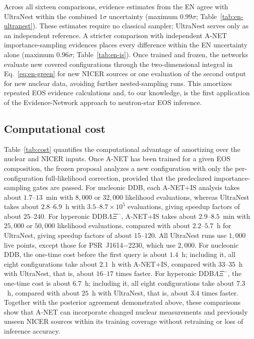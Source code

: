 \documentclass[aps,prd,twocolumn,superscriptaddress,nofootinbib,longbibliography]{revtex4-2}
\begin{document}
Across all sixteen comparisons, evidence estimates from the EN agree with
UltraNest within the combined $1\sigma$ uncertainty (maximum $0.99\sigma$;
Table~\ref{tab:en-ultranest}). These estimates require no classical sampler;
UltraNest serves only as an independent reference. A stricter comparison with
independent A-NET importance-sampling evidences places every difference within
the EN uncertainty alone (maximum $0.96\sigma$; Table~\ref{tab:en-is}). Once
trained and frozen, the networks evaluate new covered configurations through
the two-dimensional integral in Eq.~\eqref{eq:en-green} for new NICER sources or
one evaluation of the second output for new nuclear data, avoiding further
nested-sampling runs. This amortizes repeated EOS evidence calculations and, to
our knowledge, is the first application of the Evidence-Network approach to
neutron-star EOS inference.

\raggedbottom
\subsection{Computational cost}
\label{sec:results:computational-cost}

Table~\ref{tab:cost} quantifies the computational advantage of
amortizing over the nuclear and NICER inputs. Once A-NET has been trained for
a given EOS composition, the frozen proposal analyzes a new configuration with
only the per-configuration full-likelihood correction, provided that the
predeclared importance-sampling gates are passed. For nucleonic DDB, each
A-NET+IS analysis takes about $1.7$--$13$~min with $8{,}000$ or $32{,}000$
likelihood evaluations, whereas UltraNest takes about $2.8$--$6.9$~h with
$3.5$--$8.7\times10^{5}$ evaluations, giving speedup factors of about
$25$--$240$. For hyperonic DDB$\Lambda\Xi^-$, A-NET+IS takes about
$2.9$--$8.5$~min with $25{,}000$ or $50{,}000$ likelihood evaluations, compared
with about $2.2$--$5.7$~h for UltraNest, giving speedup factors of about
$15$--$120$. All UltraNest runs use $1{,}000$ live points, except those for
PSR~J1614$-$2230, which use $2{,}000$. For nucleonic DDB, the one-time cost
before the first query is about $1.4$~h; including it, all eight
configurations take about $2.1$~h with A-NET+IS, compared with $33$--$35$~h
with UltraNest, that is, about $16$--$17$ times faster. For hyperonic
DDB$\Lambda\Xi^-$, the one-time cost is about $6.7$~h; including it, all eight
configurations take about $7.3$~h, compared with about $25$~h with UltraNest,
that is, about $3.4$ times faster. Together with the posterior agreement
demonstrated above, these comparisons show that A-NET can incorporate changed
nuclear measurements and previously unseen NICER sources within its training
coverage without retraining or loss of inference accuracy.
\end{document}
